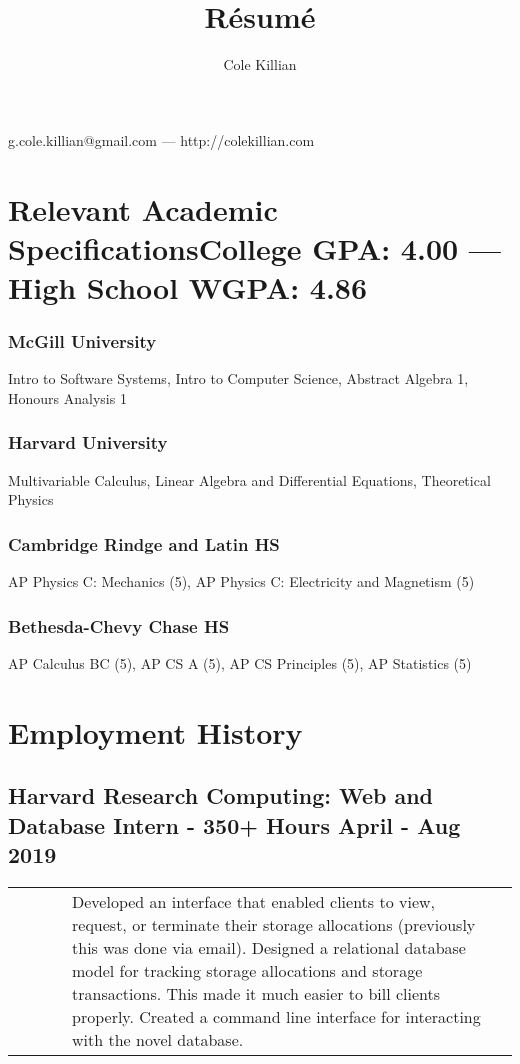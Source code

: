 \documentclass{article}
\makeatletter
\renewcommand{\maketitle}{
\begin{center}
{\color{green}\huge\bfseries
\theauthor}

\vspace{.25em}
g.cole.killian@gmail.com --- http://colekillian.com
\end{center}
}
\makeatother
\begin{document}
\title{R\'esum\'e}
\author{Cole Killian}

\maketitle


\section{Relevant Academic Specifications\hfill\normalsize College GPA: 4.00    ---     High School WGPA: 4.86}

\subsubsection{McGill University}
\hfill Intro to Software Systems, Intro to Computer Science, Abstract Algebra 1, Honours Analysis 1

\subsubsection{Harvard University}
\hfill Multivariable Calculus, Linear Algebra and Differential Equations, Theoretical Physics

\subsubsection{Cambridge Rindge and Latin HS}
\hfill AP Physics C: Mechanics (5), AP Physics C: Electricity and Magnetism (5)

\subsubsection{Bethesda-Chevy Chase HS}
\hfill AP Calculus BC (5), AP CS A (5), AP CS Principles (5), AP Statistics (5)

\section{Employment History}

\subsection{Harvard Research Computing: Web and Database Intern - 350+ Hours \hfill April - Aug 2019\newline}

\begin{tabularx}{\linewidth}{ @{} l X r @{} }
\ \ \ \ \ & Developed an interface that enabled clients to view, request, or terminate their storage allocations (previously this was done via email). Designed a relational database model for tracking storage allocations and storage transactions. This made it much easier to bill clients properly. Created a command line interface for interacting with the novel database.&
\end{tabularx}
\end{document}
